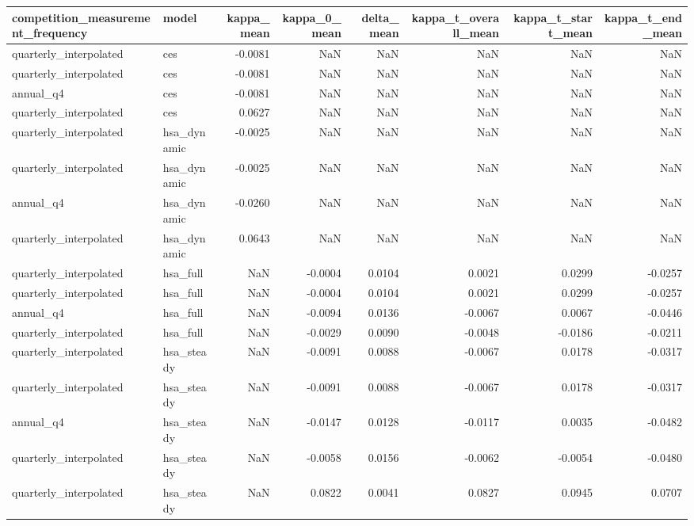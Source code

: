 \begin{tabular}{llrrrrrr}
\toprule
competition\_measurement\_frequency & model & kappa\_mean & kappa\_0\_mean & delta\_mean & kappa\_t\_overall\_mean & kappa\_t\_start\_mean & kappa\_t\_end\_mean \\
\midrule
quarterly\_interpolated & ces & -0.0081 & NaN & NaN & NaN & NaN & NaN \\
quarterly\_interpolated & ces & -0.0081 & NaN & NaN & NaN & NaN & NaN \\
annual\_q4 & ces & -0.0081 & NaN & NaN & NaN & NaN & NaN \\
quarterly\_interpolated & ces & 0.0627 & NaN & NaN & NaN & NaN & NaN \\
quarterly\_interpolated & hsa\_dynamic & -0.0025 & NaN & NaN & NaN & NaN & NaN \\
quarterly\_interpolated & hsa\_dynamic & -0.0025 & NaN & NaN & NaN & NaN & NaN \\
annual\_q4 & hsa\_dynamic & -0.0260 & NaN & NaN & NaN & NaN & NaN \\
quarterly\_interpolated & hsa\_dynamic & 0.0643 & NaN & NaN & NaN & NaN & NaN \\
quarterly\_interpolated & hsa\_full & NaN & -0.0004 & 0.0104 & 0.0021 & 0.0299 & -0.0257 \\
quarterly\_interpolated & hsa\_full & NaN & -0.0004 & 0.0104 & 0.0021 & 0.0299 & -0.0257 \\
annual\_q4 & hsa\_full & NaN & -0.0094 & 0.0136 & -0.0067 & 0.0067 & -0.0446 \\
quarterly\_interpolated & hsa\_full & NaN & -0.0029 & 0.0090 & -0.0048 & -0.0186 & -0.0211 \\
quarterly\_interpolated & hsa\_steady & NaN & -0.0091 & 0.0088 & -0.0067 & 0.0178 & -0.0317 \\
quarterly\_interpolated & hsa\_steady & NaN & -0.0091 & 0.0088 & -0.0067 & 0.0178 & -0.0317 \\
annual\_q4 & hsa\_steady & NaN & -0.0147 & 0.0128 & -0.0117 & 0.0035 & -0.0482 \\
quarterly\_interpolated & hsa\_steady & NaN & -0.0058 & 0.0156 & -0.0062 & -0.0054 & -0.0480 \\
quarterly\_interpolated & hsa\_steady & NaN & 0.0822 & 0.0041 & 0.0827 & 0.0945 & 0.0707 \\
\bottomrule
\end{tabular}
